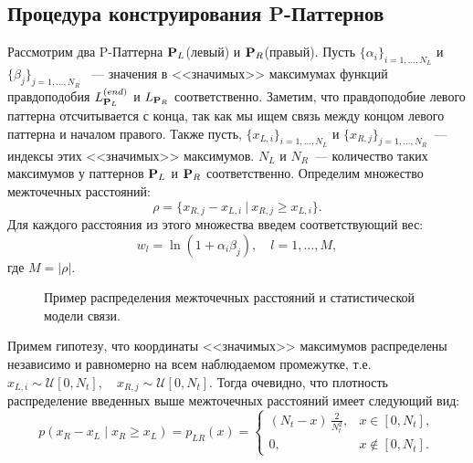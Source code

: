 \documentclass[12pt,fсeqn]{article}
\begin{document}
\subsection{Процедура конструирования P-Паттернов}
Рассмотрим два P-Паттерна ${\bf P}_L$(левый) и ${\bf P}_R$(правый). Пусть $\{\alpha_i\}_{i=1,\dots,N_L}$ и $\{\beta_j\}_{j=1,\dots,N_R}$
~--- значения в <<значимых>> максимумах функций правдоподобия $L_{{\bf P}_L}^{(end)}$ и $L_{{\bf P}_R}$ соответственно. Заметим, что 
правдоподобие левого паттерна отсчитывается с конца, так как мы ищем связь между концом левого паттерна и началом правого.
Также пусть,  $\{x_{L,i}\}_{i=1,\dots,N_L}$ и $\{x_{R,j}\}_{j=1,\dots,N_R}$~--- индексы этих <<значимых>> максимумов. $N_L$ и
$N_R$~--- количество таких максимумов у паттернов ${\bf P}_L$ и ${\bf P}_R$ соответственно. Определим множество межточечных
расстояний:
$$
\rho=\{ x_{R,j}-x_{L,i}\: |\: x_{R,j} \geqslant x_{L,i}\}.
$$
Для каждого расстояния из этого множества введем соответствующий вес:
$$
w_l = \ln (1+\alpha_i\beta_j), \quad l=1,\dots,M,
$$
где $M=|\rho|.$

\begin{figure}[H]
\noindent{}
\caption{ Пример распределения межточечных расстояний и статистической модели связи.  }
\end{figure}


Примем гипотезу, что координаты <<значимых>> максимумов распределены независимо и 
равномерно на всем наблюдаемом промежутке, т.е. $x_{L,i}\sim\mathcal{U}[0,N_t], \quad x_{R,j}\sim\mathcal{U}[0,N_t]$. 
Тогда очевидно, что плотность распределение введенных выше межточечных расстояний имеет следующий вид:
$$
p(x_R-x_L\mid x_R \geqslant x_L ) = p_{LR}(x) =
\begin{cases}
  (N_t-x)\,\frac2{N_t^2} , & x \in [0,N_t], \\
  0, & x \not\in [0,N_t].
\end{cases} 
$$
\end{document}
